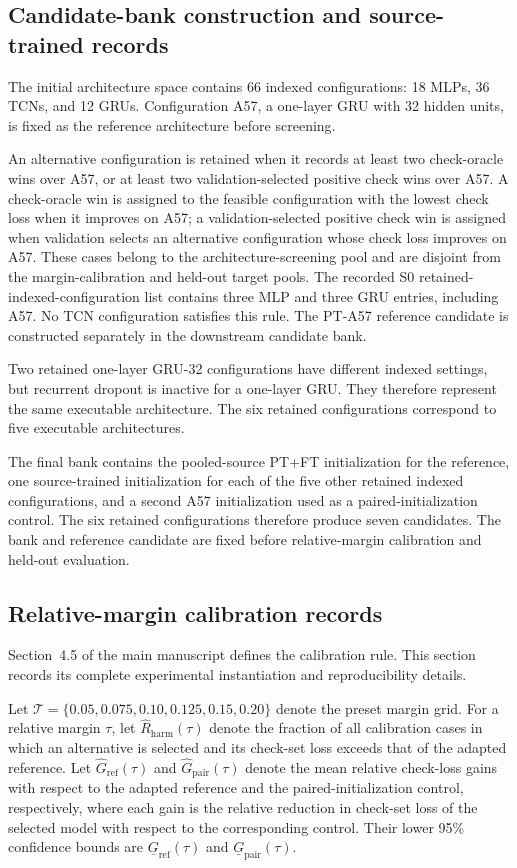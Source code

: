 \documentclass[11pt,a4paper]{article}
\begin{document}
\subsection{Candidate-bank construction and source-trained records}

The initial architecture space contains 66 indexed configurations: 18 MLPs,
36 TCNs, and 12 GRUs. Configuration A57, a one-layer GRU with 32 hidden
units, is fixed as the reference architecture before screening.

An alternative configuration is retained when it records at least two
check-oracle wins over A57, or at least two validation-selected positive check
wins over A57. A check-oracle win is assigned to the feasible configuration
with the lowest check loss when it improves on A57; a validation-selected
positive check win is assigned when validation selects an alternative
configuration whose check loss improves on A57.
These cases belong to the architecture-screening pool and are disjoint from
the margin-calibration and held-out target pools.
The recorded S0 retained-indexed-configuration list contains three MLP and
three GRU entries, including A57. No TCN configuration satisfies this rule.
The PT-A57 reference candidate is constructed separately in the downstream
candidate bank.

Two retained one-layer GRU-32 configurations have different indexed
settings, but recurrent dropout is inactive for a one-layer GRU. They
therefore represent the same executable architecture. The six retained
configurations correspond to five executable architectures.

The final bank contains the pooled-source PT+FT initialization for
the reference, one source-trained initialization for each of the five other
retained indexed configurations, and a second A57 initialization used as a
paired-initialization control. The six retained configurations therefore
produce seven candidates. The bank and reference candidate are fixed
before relative-margin calibration and held-out evaluation.

\subsection{Relative-margin calibration records}

Section~4.5 of the main manuscript defines the calibration rule. This section
records its complete experimental instantiation and reproducibility details.

Let
$\mathcal{T}=\{0.05,0.075,0.10,0.125,0.15,0.20\}$
denote the preset margin grid. For a relative margin $\tau$, let
$\widehat R_{\mathrm{harm}}(\tau)$ denote the fraction of all calibration
cases in which an alternative is selected and its check-set loss exceeds that
of the adapted reference. Let $\widehat G_{\mathrm{ref}}(\tau)$ and
$\widehat G_{\mathrm{pair}}(\tau)$ denote the mean relative check-loss gains
with respect to the adapted reference and the paired-initialization control,
respectively, where each gain is the relative reduction in check-set loss of
the selected model with respect to the corresponding control. Their lower
95\% confidence bounds are
$\underline G_{\mathrm{ref}}(\tau)$ and
$\underline G_{\mathrm{pair}}(\tau)$.
\end{document}

